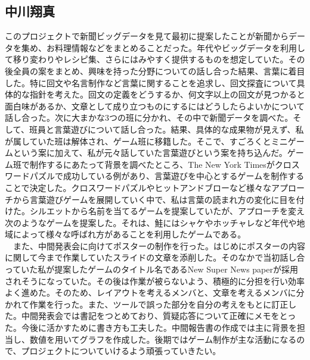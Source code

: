 \subsection{中川翔真}
このプロジェクトで新聞ビッグデータを見て最初に提案したことが新聞からデータを集め、お料理情報などをまとめることだった。年代やビッグデータを利用して移り変わりやレシピ集、さらにはみやすく提供するものを想定していた。その後全員の案をまとめ、興味を持った分野についての話し合った結果、言葉に着目した。特に回文や名言制作など言葉に関することを追求し、回文探査について具体的な指針を考えた。回文の定義をどうするか、何文字以上の回文が見つかると面白味があるか、文章として成り立つものにするにはどうしたらよいかについて話し合った。次に大まかな3つの班に分かれ、その中で新聞データを調べた。そして、班員と言葉遊びについて話し合った。結果、具体的な成果物が見えず、私が属していた班は解体され、ゲーム班に移籍した。そこで、すごろくとミニゲームという案に加えて、私が元々話していた言葉遊びという案を持ち込んだ。ゲーム班で制作するにあたって背景を調べたところ、The New York Timesがクロスワードパズルで成功している例があり、言葉遊びを中心とするゲームを制作することで決定した。クロスワードパズルやヒットアンドブローなど様々なアプローチから言葉遊びゲームを展開していく中で、私は言葉の読まれ方の変化に目を付けた。シルエットから名前を当てるゲームを提案していたが、アプローチを変え次のようなゲームを提案した。それは、鮭にはシャケやホッチャレなど年代や地域によって様々な呼ばれ方があることを利用したゲームである。\\
　また、中間発表会に向けてポスターの制作を行った。はじめにポスターの内容に関して今まで作業していたスライドの文章を添削した。そのなかで当初話し合っていた私が提案したゲームのタイトル名であるNew Super News paperが採用されそうになっていた。その後は作業が被らないよう、積極的に分担を行い効率よく進めた。そのため、レイアウトを考えるメンバと、文章を考えるメンバに分かれて作業を行った。また、ツールで誤った部分を自分の考えをもとに訂正した。中間発表会では書記をつとめており、質疑応答について正確にメモをとった。今後に活かすために書き方も工夫した。中間報告書の作成では主に背景を担当し、数値を用いてグラフを作成した。後期ではゲーム制作が主な活動になるので、プロジェクトについていけるよう頑張っていきたい。


